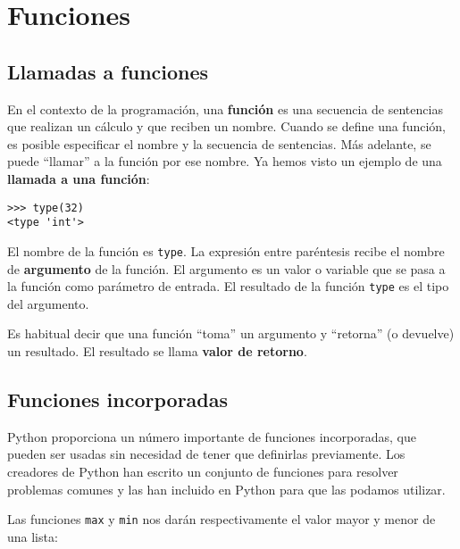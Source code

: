
\chapter{Funciones}
\label{funcchap}

\section{Llamadas a funciones}
\label{functionchap}

En el contexto de la programación, una {\bf función} es una secuencia de
sentencias que realizan un cálculo y que reciben un nombre. Cuando se define una función,
es posible especificar el nombre y la secuencia de sentencias. Más adelante, se puede
``llamar'' a la función por ese nombre.
Ya hemos visto un ejemplo de una {\bf llamada a una función}:

\beforeverb
\begin{verbatim}
>>> type(32)
<type 'int'>
\end{verbatim}
\afterverb
%
El nombre de la función es {\tt type}. La expresión entre paréntesis recibe
el nombre de {\bf argumento} de la función. El argumento es
un valor o variable que se pasa a la función como parámetro de entrada.
El resultado de la función {\tt type} es el tipo del argumento.


Es habitual decir que una función ``toma'' un argumento y ``retorna'' (o devuelve)
un resultado. El resultado se llama {\bf valor de retorno}.


\section{Funciones incorporadas}

Python proporciona un número importante de funciones incorporadas, que
pueden ser usadas sin necesidad de tener que definirlas previamente.
Los creadores de Python han escrito un conjunto de funciones
para resolver problemas comunes y las han incluido en Python para que las podamos utilizar.

Las funciones {\tt max} y {\tt min} nos darán respectivamente
el valor mayor y menor de una lista:


